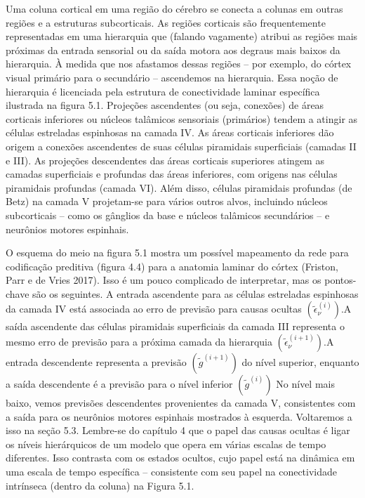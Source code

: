\documentclass[
  12pt,
]{book}
\begin{document}
Uma coluna cortical em uma região do cérebro se conecta a colunas em outras regiões e a estruturas subcorticais. As regiões corticais são frequentemente representadas em uma hierarquia que (falando vagamente) atribui as regiões mais próximas da entrada sensorial ou da saída motora aos degraus mais baixos da hierarquia. À medida que nos afastamos dessas regiões -- por exemplo, do córtex visual primário para o secundário -- ascendemos na hierarquia. Essa noção de hierarquia é licenciada pela estrutura de conectividade laminar específica ilustrada na figura 5.1. Projeções ascendentes (ou seja, conexões) de áreas corticais inferiores ou núcleos talâmicos sensoriais (primários) tendem a atingir as células estreladas espinhosas na camada IV. As áreas corticais inferiores dão origem a conexões ascendentes de suas células piramidais superficiais (camadas II e III). As projeções descendentes das áreas corticais superiores atingem as camadas superficiais e profundas das áreas inferiores, com origens nas células piramidais profundas (camada VI). Além disso, células piramidais profundas (de Betz) na camada V projetam-se para vários outros alvos, incluindo núcleos subcorticais -- como os gânglios da base e núcleos talâmicos secundários -- e neurônios motores espinhais.

O esquema do meio na figura 5.1 mostra um possível mapeamento da rede para codificação preditiva (figura 4.4) para a anatomia laminar do córtex (Friston, Parr e de Vries 2017). Isso é um pouco complicado de interpretar, mas os pontos-chave são os seguintes. A entrada ascendente para as células estreladas espinhosas da camada IV está associada ao erro de previsão para causas ocultas \((\tilde \epsilon_\nu^{(i)})\).A saída ascendente das células piramidais superficiais da camada III representa o mesmo erro de previsão para a próxima camada da hierarquia \((\tilde \epsilon_\nu^{(i+1)})\).A entrada descendente representa a previsão \((\tilde g^{(i+1)})\) do nível superior, enquanto a saída descendente é a previsão para o nível inferior \((\tilde g^{(i)})\) No nível mais baixo, vemos previsões descendentes provenientes da camada V, consistentes com a saída para os neurônios motores espinhais mostrados à esquerda. Voltaremos a isso na seção 5.3. Lembre-se do capítulo 4 que o papel das causas ocultas é ligar os níveis hierárquicos de um modelo que opera em várias escalas de tempo diferentes. Isso contrasta com os estados ocultos, cujo papel está na dinâmica em uma escala de tempo específica -- consistente com seu papel na conectividade intrínseca (dentro da coluna) na Figura 5.1.
\end{document}

